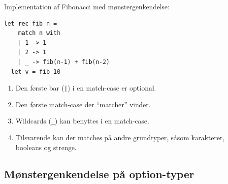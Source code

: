 \documentclass[rgb]{beamer}
\begin{document}
\begin{frame}[fragile]
\begin{footnotesize}


  \vspace{1ex}

  Implementation af Fibonacci med mønstergenkendelse:

  \vspace{1ex}

\begin{lstlisting}[numbers=none,frame=none,mathescape]
  let rec fib n =
    match n with
    | 1 -> 1
    | 2 -> 1
    | _ -> fib(n-1) + fib(n-2)
  let v = fib 10
\end{lstlisting}

  \vspace{1ex}

  \begin{enumerate}
  \item Den første bar (\lstinline{|}) i en match-case er optional.
  \item Den første match-case der ``matcher'' vinder.
  \item Wildcards (\lstinline{_}) kan benyttes i en match-case.
  \item Tilsvarende kan der matches på andre grundtyper, såsom karakterer, booleans og strenge.
  \end{enumerate}
\end{footnotesize}
\end{frame}

\subsection{Mønstergenkendelse på option-typer}
\end{document}
